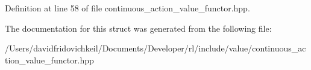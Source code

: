 Definition at line 58 of file continuous\+\_\+action\+\_\+value\+\_\+functor.\+hpp.



The documentation for this struct was generated from the following file\+:\begin{DoxyCompactItemize}
\item 
/\+Users/davidfridovichkeil/\+Documents/\+Developer/rl/include/value/continuous\+\_\+action\+\_\+value\+\_\+functor.\+hpp\end{DoxyCompactItemize}
